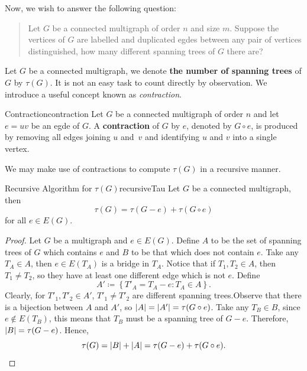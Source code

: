 \documentclass[math]{amznotes}
\theoremstyle{remark}
\newcommand{\0}{\mathbf{0}}
\newcommand{\1}{\mathbf{1}}
\begin{document}
Now, we wish to answer the following question:
\begin{quote}
    Let $G$ be a connected multigraph of order $n$ and size $m$. Suppose the vertices of $G$ are labelled and duplicated egdes between any pair of vertices distinguished, how many different spanning trees of $G$ there are?
\end{quote}
Let $G$ be a connected multigraph, we denote \textbf{the number of spanning trees} of $G$ by $\tau(G)$. It is not an easy task to count directly by observation. We introduce a useful concept known as \textit{contraction}.
\begin{dfnbox}{Contraction}{contraction}
    Let $G$ be a connected multigraph of order $n$ and let $e = uv$ be an egde of $G$. A {\color{red} \textbf{contraction}} of $G$ by $e$, denoted by $G \circ e$, is produced by removing all edges joining $u$ and~$v$ and identifying $u$ and $v$ into a single vertex.
\end{dfnbox}
We may make use of contractions to compute $\tau(G)$ in a recursive manner.
\begin{thmbox}{Recursive Algorithm for $\tau(G)$}{recursiveTau}
    Let $G$ be a connected multigraph, then
    \begin{equation*}
        \tau(G) = \tau(G - e) + \tau(G \circ e)
    \end{equation*}
    for all $e \in E(G)$.
    \tcblower
    \begin{proof}
        Let $G$ be a multigraph and $e \in E(G)$. Define $A$ to be the set of spanning trees of $G$ which contains $e$ and $B$ to be that which does not contain $e$. Take any $T_A \in A$, then $e \in E(T_A)$ is a bridge in $T_A$. Notice that if $T_1, T_2 \in A$, then~$T_1 \neq T_2$, so they have at least one different edge which is not $e$. Define
        \begin{equation*}
            A' \coloneqq \left\{T'_A = T_A - e \colon T_A \in A\right\}.
        \end{equation*}
        Clearly, for $T'_1, T'_2 \in A'$, $T'_1 \neq T'_2$ are different spanning trees.Observe that there is a bijection between $A$ and $A'$, so ${\left\lvert {A} \right\rvert} = {\left\lvert {A'} \right\rvert} = \tau(G \circ e)$. Take any $T_B \in B$, since $e \notin E(T_B)$, this means that $T_B$ must be a spanning tree of $G - e$. Therefore,~${\left\lvert {B} \right\rvert} = \tau(G - e)$. Hence,
        \begin{equation*}
            \tau(G) = {\left\lvert {B} \right\rvert} + {\left\lvert {A} \right\rvert} = \tau(G - e) + \tau(G \circ e).
        \end{equation*}
    \end{proof}
\end{thmbox}
\end{document}
